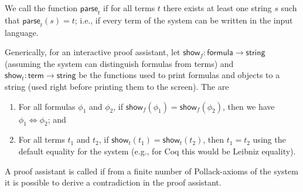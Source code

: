 \begin{node}
\begin{definition}\label{itp-0005}%
We call the function $\mathsf{parse}_{t}$  if for
all terms $t$ there exists at least one string $s$ such that
$\mathsf{parse}_{t}(s)=t$; i.e., if every term of the system can be
written in the input language.
\end{definition}


\begin{definition}\label{itp-0000}%
Generically, for an interactive proof assistant, let
$\mathsf{show}_{f}\colon\mathsf{formula}\to\mathsf{string}$ (assuming
the system can distinguish formulas from terms) and 
$\mathsf{show}_{t}\colon\mathsf{term}\to\mathsf{string}$ be the
functions used to print formulas and objects to a string (used right
before printing them to the screen). The  are
\begin{enumerate}
\item For all formulas $\phi_{1}$ and $\phi_{2}$, if
  $\mathsf{show}_{f}(\phi_{1})=\mathsf{show}_{f}(\phi_{2})$, then we
  have $\phi_{1}\iff\phi_{2}$; and
\item For all terms $t_{1}$ and $t_{2}$, if $\mathsf{show}_{t}(t_{1})=\mathsf{show}_{t}(t_{2})$,
  then $t_{1}=t_{2}$ using the default equality for the system (e.g.,
  for Coq this would be Leibniz equality).
\end{enumerate}
\end{definition}

\begin{definition}\label{itp-0006}%
A proof assistant is called  if from a
finite number of Pollack-axioms of the system it is possible to derive a
contradiction in the proof assistant.
\end{definition}
\end{node}
